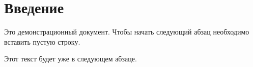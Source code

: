 \documentclass[russian,utf8,floatsection]{eskdtext}
\begin{document}
 \maketitle %
 \tableofcontents %
 \newpage %
 \section{Введение} %
 Это демонстрационный документ. Чтобы начать следующий абзац необходимо
 вставить пустую строку.

 Этот текст будет уже в следующем абзаце.
 
\end{document}
